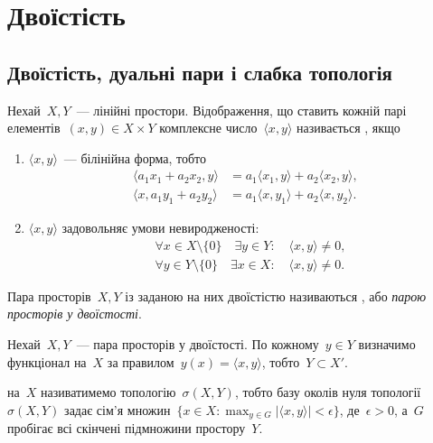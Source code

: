 \chapter{Двоїстість}

\section{Двоїстість, дуальні пари і слабка топологія}

\begin{definition}
    Нехай~$X, Y$~--- лінійні простори. Відображення, що ставить кожній парі елементів~$(x, y) \in X \times Y$ комплексне число~$\langle x, y\rangle$ називається , якщо
    \begin{enumerate}
        \item $\langle x, y \rangle$~--- білінійна форма, тобто
        \begin{align*}
            \langle a_1 x_1 + a_2 x_2, y \rangle &= a_1 \langle x_1, y \rangle + a_2 \langle x_2, y \rangle, \\
            \langle x, a_1 y_1 + a_2 y_2 \rangle &= a_1 \langle x, y_1 \rangle + a_2 \langle x, y_2 \rangle.
        \end{align*}
        \item $\langle x, y \rangle$ задовольняє умови невиродженості:
        \begin{align*}
            & \forall x \in X \setminus \{0\} \quad \exists y \in Y: \quad \langle x, y \rangle \ne 0, \\
            & \forall y \in Y \setminus \{0\} \quad \exists x \in X: \quad \langle x, y \rangle \ne 0.
        \end{align*}
    \end{enumerate}
\end{definition}

\begin{definition}
    Пара просторів~$X, Y$ із заданою на них двоїстістю називаються , або \emph{парою просторів у двоїстості}.
\end{definition}

\begin{definition}
    Нехай~$X, Y$~--- пара просторів у двоїстості. По кожному~$y \in Y$ визначимо функціонал на~$X$ за правилом~$y(x) = \langle x, y \rangle$, тобто~$Y \subset X'$.

     на~$X$ називатимемо топологію~$\sigma(X, Y)$, тобто базу околів нуля топології~$\sigma(X, Y)$ задає сім'я множин~$\{x \in X: \max_{y \in G} |\langle x, y \rangle| < \epsilon\}$, де~$\epsilon > 0$, а~$G$ пробігає всі скінчені підмножини простору~$Y$.
\end{definition}

